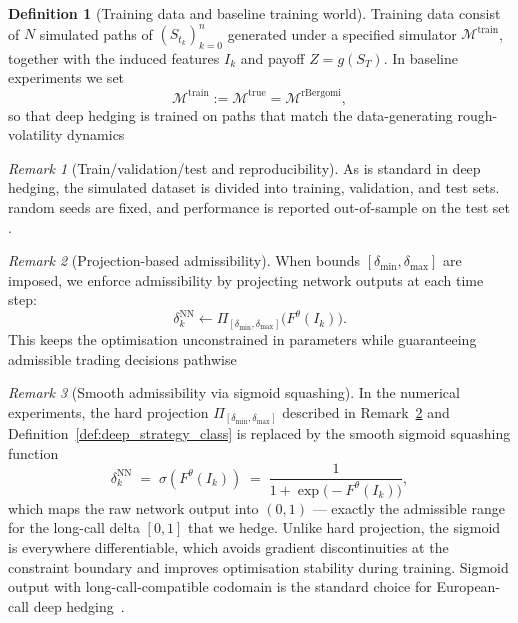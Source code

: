 \documentclass[12pt,a4paper]{article}
\theoremstyle{definition}
\newtheorem{definition}{Definition}[section]
\theoremstyle{plain}
\theoremstyle{remark}
\newtheorem{remark}{Remark}[section]
\theoremstyle{plain}
\begin{document}
\label{subsubsec:deep_training_protocol}

\begin{definition}[Training data and baseline training world]
\label{def:deep_training_data}
Training data consist of $N$ simulated paths of $(S_{t_k})_{k=0}^n$ generated under a specified simulator $\mathcal{M}^{\mathrm{train}}$,
together with the induced features $I_k$ and payoff $Z=g(S_T)$.
In baseline experiments we set
\[
\mathcal{M}^{\mathrm{train}} := \mathcal{M}^{\mathrm{true}}=\mathcal{M}^{\mathrm{rBergomi}},
\]
so that deep hedging is trained on paths that match the data-generating rough-volatility dynamics \cite{BayerFriz2016,Horvath2021DeepRough}
\end{definition}

\begin{remark}[Train/validation/test and reproducibility]
\label{rem:split_reproducibility}
As is standard in deep hedging, the simulated dataset is divided into training, validation, and test sets.
random seeds are fixed, and performance is reported out-of-sample on the test set \cite{Buehler2019DeepHedging,Horvath2021DeepRough}.
\end{remark}

\label{subsubsec:deep_constraints}

\begin{remark}[Projection-based admissibility]
\label{rem:projection_constraints}
When bounds $[\delta_{\min},\delta_{\max}]$ are imposed, we enforce admissibility by projecting network outputs at each time step:
\[
\delta_k^{\mathrm{NN}} \leftarrow \Pi_{[\delta_{\min},\delta_{\max}]}\!\bigl(F^\theta(I_k)\bigr).
\]
This keeps the optimisation unconstrained in parameters while guaranteeing admissible trading decisions pathwise \cite{Buehler2019DeepHedging}
\end{remark}

\begin{remark}[Smooth admissibility via sigmoid squashing]
\label{rem:sigmoid_squashing}
In the numerical experiments, the hard projection
$\Pi_{[\delta_{\min},\delta_{\max}]}$ described in
Remark~\ref{rem:projection_constraints} and
Definition~\ref{def:deep_strategy_class} is replaced by the smooth
sigmoid squashing function
\[
  \delta_k^{\mathrm{NN}}
  \;=\;
  \sigma\!\left(F^\theta(I_k)\right)
  \;=\;
  \frac{1}{1 + \exp\!\bigl(-F^\theta(I_k)\bigr)},
\]
which maps the raw network output into $(0, 1)$ --- exactly the admissible range for the long-call delta $[0, 1]$ that we hedge.
Unlike hard projection, the sigmoid is everywhere differentiable,
which avoids gradient discontinuities at the constraint boundary
and improves optimisation stability during training.
Sigmoid output with long-call-compatible codomain is the standard
choice for European-call deep hedging~\cite{Buehler2019DeepHedging}.
\end{remark}
\end{document}

